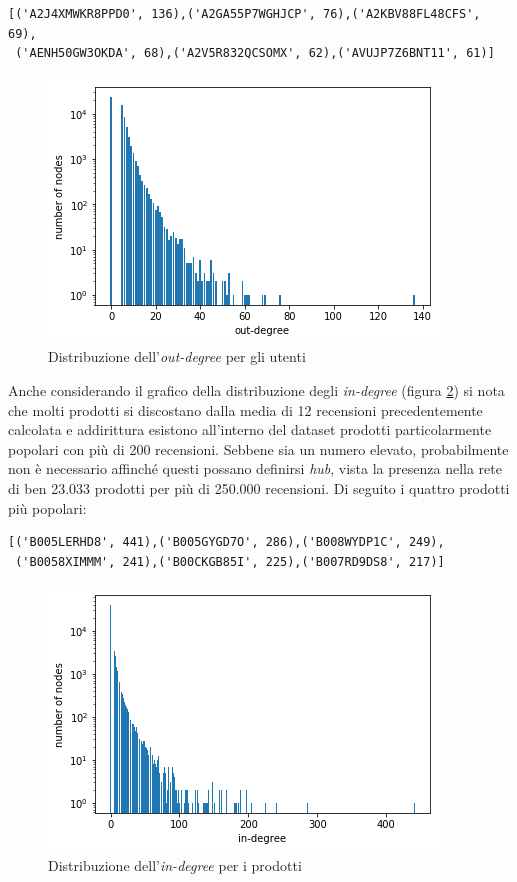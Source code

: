 \documentclass[hidelinks, 12pt]{article}
\begin{document}
\begin{verbatim}
[('A2J4XMWKR8PPD0', 136),('A2GA55P7WGHJCP', 76),('A2KBV88FL48CFS', 69),
 ('AENH50GW3OKDA', 68),('A2V5R832QCSOMX', 62),('AVUJP7Z6BNT11', 61)]
\end{verbatim}

\begin{figure}[H]
	\centering
	\includegraphics[scale=0.7]{images/03_04_out_degree.png}
	\caption[Distribuzione dell'\textit{out-degree} per gli utenti]{Distribuzione dell'\textit{out-degree} per gli utenti}
	\label{fig:out-degree}
\end{figure}

Anche considerando il grafico della distribuzione degli \textit{in-degree} (figura \ref{fig:in-degree}) si nota che molti prodotti si discostano dalla media di 12 recensioni precedentemente calcolata e addirittura esistono all'interno del dataset prodotti particolarmente popolari con più di 200 recensioni. Sebbene sia un numero elevato, probabilmente non è necessario affinché questi possano definirsi \textit{hub}, vista la presenza nella rete di ben 23.033 prodotti per più di 250.000 recensioni. Di seguito i quattro prodotti più popolari:

\begin{verbatim}
[('B005LERHD8', 441),('B005GYGD7O', 286),('B008WYDP1C', 249),
 ('B0058XIMMM', 241),('B00CKGB85I', 225),('B007RD9DS8', 217)]
\end{verbatim}

\begin{figure}[H]
\centering
\includegraphics[scale=0.7]{images/03_04_in_degree.png}
\caption[Distribuzione dell'\textit{in-degree} per i prodotti]{Distribuzione dell'\textit{in-degree} per i prodotti}
\label{fig:in-degree}
\end{figure}
\end{document}
